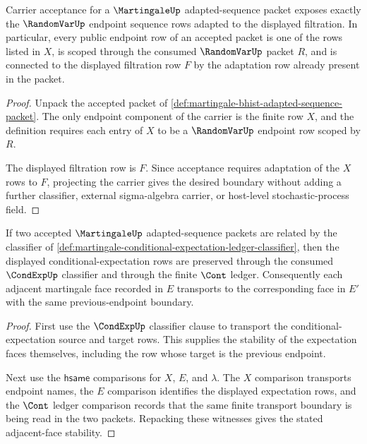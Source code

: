 \begin{theorem}
\label{thm:martingale-adapted-sequence-carrier-boundary}
Carrier acceptance for a $\MartingaleUp$ adapted-sequence packet exposes exactly the $\RandomVarUp$ endpoint sequence rows adapted to the displayed filtration. In particular, every public endpoint row of an accepted packet is one of the rows listed in $X$, is scoped through the consumed $\RandomVarUp$ packet $R$, and is connected to the displayed filtration row $F$ by the adaptation row already present in the packet.
\end{theorem}
\begin{proof}
Unpack the accepted packet of \autoref{def:martingale-bhist-adapted-sequence-packet}. The only endpoint component of the carrier is the finite row $X$, and the definition requires each entry of $X$ to be a $\RandomVarUp$ endpoint row scoped by $R$.

The displayed filtration row is $F$. Since acceptance requires adaptation of the $X$ rows to $F$, projecting the carrier gives the desired boundary without adding a further classifier, external sigma-algebra carrier, or host-level stochastic-process field.
\end{proof}

\begin{theorem}
\label{thm:martingale-conditional-expectation-ledger-stability}
If two accepted $\MartingaleUp$ adapted-sequence packets are related by the classifier of \autoref{def:martingale-conditional-expectation-ledger-classifier}, then the displayed conditional-expectation rows are preserved through the consumed $\CondExpUp$ classifier and through the finite $\Cont$ ledger. Consequently each adjacent martingale face recorded in $E$ transports to the corresponding face in $E'$ with the same previous-endpoint boundary.
\end{theorem}
\begin{proof}
First use the $\CondExpUp$ classifier clause to transport the conditional-expectation source and target rows. This supplies the stability of the expectation faces themselves, including the row whose target is the previous endpoint.

Next use the $\mathsf{hsame}$ comparisons for $X$, $E$, and $\lambda$. The $X$ comparison transports endpoint names, the $E$ comparison identifies the displayed expectation rows, and the $\Cont$ ledger comparison records that the same finite transport boundary is being read in the two packets. Repacking these witnesses gives the stated adjacent-face stability.
\end{proof}

